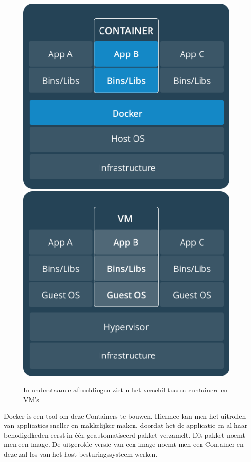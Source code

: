 \begin{figure}
	\centering
	\caption{In onderstaande afbeeldingen ziet u het verschil tussen containers en VM's}
	\includegraphics[scale=0.2]{img/containers.png}
	\label{fig:containers}
	\includegraphics[scale=0.2]{img/vms.png}
	\label{fig:vms}
\end{figure}

Docker is een tool om deze Containers te bouwen. Hiermee kan men het uitrollen van applicaties sneller en makkelijker maken, doordat het de applicatie en al haar benodigdheden eerst in één geautomatiseerd pakket verzamelt. Dit pakket noemt men een image. De uitgerolde versie van een image noemt men een Container en deze zal los van het host-besturingssysteem werken.

